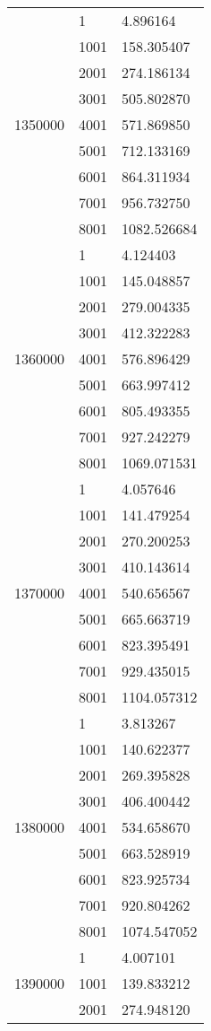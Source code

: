 \begin{table}[htb!]
\begin{tabular}{lll}
\multirow[c]{9}{*}{1350000} & 1 & 4.896164 \\
 & 1001 & 158.305407 \\
 & 2001 & 274.186134 \\
 & 3001 & 505.802870 \\
 & 4001 & 571.869850 \\
 & 5001 & 712.133169 \\
 & 6001 & 864.311934 \\
 & 7001 & 956.732750 \\
 & 8001 & 1082.526684 \\
\multirow[c]{9}{*}{1360000} & 1 & 4.124403 \\
 & 1001 & 145.048857 \\
 & 2001 & 279.004335 \\
 & 3001 & 412.322283 \\
 & 4001 & 576.896429 \\
 & 5001 & 663.997412 \\
 & 6001 & 805.493355 \\
 & 7001 & 927.242279 \\
 & 8001 & 1069.071531 \\
\multirow[c]{9}{*}{1370000} & 1 & 4.057646 \\
 & 1001 & 141.479254 \\
 & 2001 & 270.200253 \\
 & 3001 & 410.143614 \\
 & 4001 & 540.656567 \\
 & 5001 & 665.663719 \\
 & 6001 & 823.395491 \\
 & 7001 & 929.435015 \\
 & 8001 & 1104.057312 \\
\multirow[c]{9}{*}{1380000} & 1 & 3.813267 \\
 & 1001 & 140.622377 \\
 & 2001 & 269.395828 \\
 & 3001 & 406.400442 \\
 & 4001 & 534.658670 \\
 & 5001 & 663.528919 \\
 & 6001 & 823.925734 \\
 & 7001 & 920.804262 \\
 & 8001 & 1074.547052 \\
\multirow[c]{9}{*}{1390000} & 1 & 4.007101 \\
 & 1001 & 139.833212 \\
 & 2001 & 274.948120 \\

\end{tabular}
\end{table}
